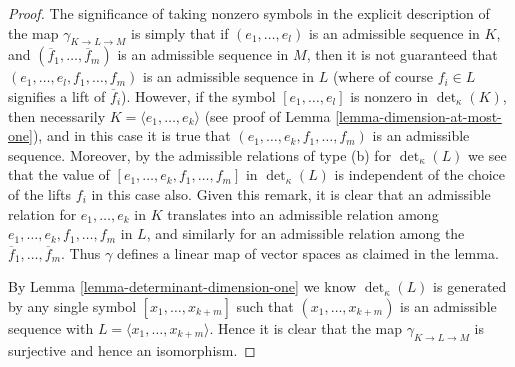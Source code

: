 \begin{proof}
The significance of taking nonzero symbols in the explicit description
of the map $\gamma_{K \to L \to M}$ is simply that if $(e_1, \ldots, e_l)$
is an admissible sequence in $K$, and
$(\overline{f}_1, \ldots, \overline{f}_m)$ is an admissible sequence in
$M$, then it is not guaranteed that $(e_1, \ldots, e_l, f_1, \ldots, f_m)$
is an admissible sequence in $L$ (where of course $f_i \in L$ signifies
a lift of $\overline{f}_i$). However, if the symbol
$[e_1, \ldots, e_l]$ is nonzero in $\det_\kappa(K)$, then
necessarily $K = \langle e_1, \ldots, e_k\rangle$ (see
proof of Lemma \ref{lemma-dimension-at-most-one}), and
in this case it is true that $(e_1, \ldots, e_k, f_1, \ldots, f_m)$
is an admissible sequence.
Moreover, by the admissible relations of type (b) for $\det_\kappa(L)$
we see that the value of $[e_1, \ldots, e_k, f_1, \ldots, f_m]$ in
$\det_\kappa(L)$ is independent of the choice of the lifts
$f_i$ in this case also. Given this remark, it is clear
that an admissible relation for $e_1, \ldots, e_k$ in $K$
translates into an admissible relation among
$e_1, \ldots, e_k, f_1, \ldots, f_m$ in $L$, and
similarly for an admissible relation among the
$\overline{f}_1, \ldots, \overline{f}_m$.
Thus $\gamma$ defines a linear map of vector spaces as claimed in the lemma.

\medskip\noindent
By Lemma \ref{lemma-determinant-dimension-one} we know
$\det_\kappa(L)$ is generated by any single
symbol $[x_1, \ldots, x_{k + m}]$ such that
$(x_1, \ldots, x_{k + m})$ is an admissible sequence
with $L = \langle x_1, \ldots, x_{k + m}\rangle$. Hence it is
clear that the map $\gamma_{K \to L \to M}$ is surjective and
hence an isomorphism.


\end{proof}
